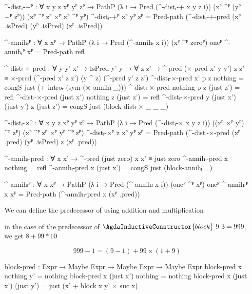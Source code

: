 \begin{code}[hide]
  ^-distᵣ-+ᴾ :
    ∀ {x y z} xᴾ yᴾ zᴾ →
    PathP (λ i → Pred (^-distᵣ-+ x y z i))
      (xᴾ ^ᴾ (yᴾ +ᴾ zᴾ)) (xᴾ ^ᴾ zᴾ ×ᴾ xᴾ ^ᴾ yᴾ)
  ^-distᵣ-+ᴾ xᴾ yᴾ zᴾ =
    Pred-path (^-distᵣ-+-pred (xᴾ .isPred) (yᴾ .isPred) (zᴾ .isPred))

  ^-annihᵣᴾ : ∀ {x} xᴾ → PathP (λ i → Pred (^-annihᵣ x i)) (xᴾ ^ᴾ zeroᴾ) oneᴾ
  ^-annihᵣᴾ xᴾ = Pred-path refl

  ^-distₗ-×-pred :
    ∀ {y y'} x' → IsPred y' y → ∀ z z' →
    ^-pred (×-pred x' y y') z z' ≡
    ×-pred (^-pred x' z z') (y ^ z) (^-pred y' z z')
  ^-distₗ-×-pred x' p z nothing = congS just (+-introᵣ (sym (×-annihₗ _)))
  ^-distₗ-×-pred nothing p z (just z') = refl
  ^-distₗ-×-pred (just x') nothing z (just z') = refl
  ^-distₗ-×-pred {y} (just x') (just y') z (just z') =
    congS just (block-distₗ-× _ _ _)

  ^-distₗ-×ᴾ :
    ∀ {x y z} xᴾ yᴾ zᴾ →
    PathP (λ i → Pred (^-distₗ-× x y z i))
      ((xᴾ ×ᴾ yᴾ) ^ᴾ zᴾ) (xᴾ ^ᴾ zᴾ ×ᴾ yᴾ ^ᴾ zᴾ)
  ^-distₗ-×ᴾ {z} xᴾ yᴾ zᴾ =
    Pred-path (^-distₗ-×-pred (xᴾ .pred) (yᴾ .isPred) z (zᴾ .pred))

  ^-annihₗ-pred : ∀ x x' → ^-pred (just zero) x x' ≡ just zero
  ^-annihₗ-pred x nothing = refl
  ^-annihₗ-pred x (just x') = congS just (block-annihₗ _)

  ^-annihₗᴾ : ∀ {x} xᴾ → PathP (λ i → Pred (^-annihₗ x i)) (oneᴾ ^ᴾ xᴾ) oneᴾ
  ^-annihₗᴾ {x} xᴾ = Pred-path (^-annihₗ-pred x (xᴾ .pred))
\end{code}
We can define the predecessor of  using addition
and multiplication

in the case of the predecessor of $\AgdaInductiveConstructor{block}\ 9\ 3 =
999$, we get $8 + 99 * 10$

\[999-1 = (9-1) + 99 \times (1+9)\]
\begin{code}
  block-pred : Expr → Maybe Expr → Maybe Expr → Maybe Expr
  block-pred x nothing y' = nothing
  block-pred x (just x') nothing = nothing
  block-pred x (just x') (just y') = just (x' + block x y' × suc x)
\end{code}

